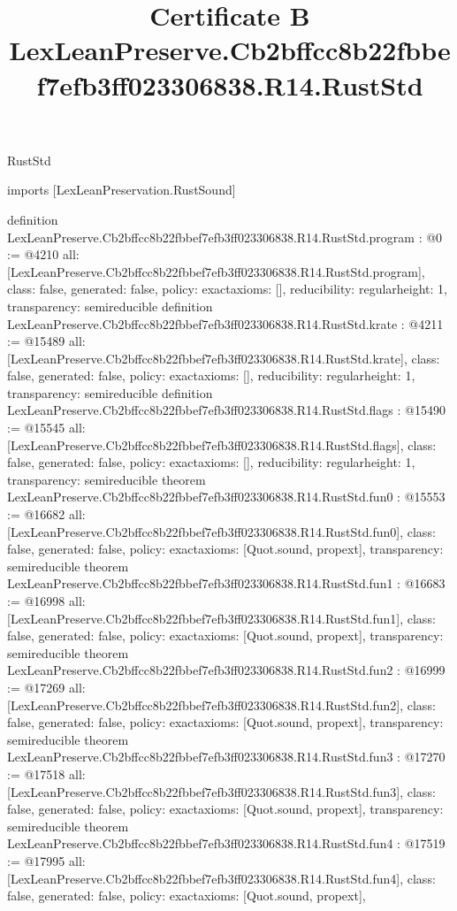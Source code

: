 \begin{lexlean}{RustStd}
\title{Certificate B LexLeanPreserve.Cb2bffcc8b22fbbef7efb3ff023306838.R14.RustStd}
\begin{coremodule}
imports [LexLeanPreservation.RustSound]

definition LexLeanPreserve.Cb2bffcc8b22fbbef7efb3ff023306838.R14.RustStd.program : @0 := @4210 {
  all: [LexLeanPreserve.Cb2bffcc8b22fbbef7efb3ff023306838.R14.RustStd.program],
  class: false,
  generated: false,
  policy: exact{axioms: []},
  reducibility: regular{height: 1},
  transparency: semireducible
}
definition LexLeanPreserve.Cb2bffcc8b22fbbef7efb3ff023306838.R14.RustStd.krate : @4211 := @15489 {
  all: [LexLeanPreserve.Cb2bffcc8b22fbbef7efb3ff023306838.R14.RustStd.krate],
  class: false,
  generated: false,
  policy: exact{axioms: []},
  reducibility: regular{height: 1},
  transparency: semireducible
}
definition LexLeanPreserve.Cb2bffcc8b22fbbef7efb3ff023306838.R14.RustStd.flags : @15490 := @15545 {
  all: [LexLeanPreserve.Cb2bffcc8b22fbbef7efb3ff023306838.R14.RustStd.flags],
  class: false,
  generated: false,
  policy: exact{axioms: []},
  reducibility: regular{height: 1},
  transparency: semireducible
}
theorem LexLeanPreserve.Cb2bffcc8b22fbbef7efb3ff023306838.R14.RustStd.fun0 : @15553 := @16682 {
  all: [LexLeanPreserve.Cb2bffcc8b22fbbef7efb3ff023306838.R14.RustStd.fun0],
  class: false,
  generated: false,
  policy: exact{axioms: [Quot.sound, propext]},
  transparency: semireducible
}
theorem LexLeanPreserve.Cb2bffcc8b22fbbef7efb3ff023306838.R14.RustStd.fun1 : @16683 := @16998 {
  all: [LexLeanPreserve.Cb2bffcc8b22fbbef7efb3ff023306838.R14.RustStd.fun1],
  class: false,
  generated: false,
  policy: exact{axioms: [Quot.sound, propext]},
  transparency: semireducible
}
theorem LexLeanPreserve.Cb2bffcc8b22fbbef7efb3ff023306838.R14.RustStd.fun2 : @16999 := @17269 {
  all: [LexLeanPreserve.Cb2bffcc8b22fbbef7efb3ff023306838.R14.RustStd.fun2],
  class: false,
  generated: false,
  policy: exact{axioms: [Quot.sound, propext]},
  transparency: semireducible
}
theorem LexLeanPreserve.Cb2bffcc8b22fbbef7efb3ff023306838.R14.RustStd.fun3 : @17270 := @17518 {
  all: [LexLeanPreserve.Cb2bffcc8b22fbbef7efb3ff023306838.R14.RustStd.fun3],
  class: false,
  generated: false,
  policy: exact{axioms: [Quot.sound, propext]},
  transparency: semireducible
}
theorem LexLeanPreserve.Cb2bffcc8b22fbbef7efb3ff023306838.R14.RustStd.fun4 : @17519 := @17995 {
  all: [LexLeanPreserve.Cb2bffcc8b22fbbef7efb3ff023306838.R14.RustStd.fun4],
  class: false,
  generated: false,
  policy: exact{axioms: [Quot.sound, propext]},
}
\end{coremodule}
\end{lexlean}
